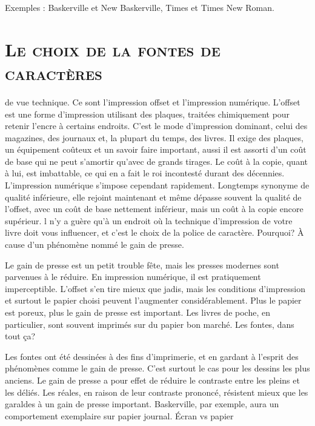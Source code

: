 \documentclass[12pt,a4paper,twocolumn]{book} %
\begin{document}
Exemples : Baskerville et New Baskerville, Times et Times New Roman.
\section{\textsc{Le choix de la fontes de caractères}}
de vue technique. Ce sont l’impression offset et l’impression numérique.
L’offset est une forme d’impression utilisant des plaques, traitées chimiquement pour retenir l’encre à certains endroits. C’est le mode d’impression dominant, celui des magazines, des journaux et, la plupart du temps, des livres. Il exige des plaques, un équipement coûteux et un savoir faire important, aussi il est assorti d’un coût de base qui ne peut s’amortir qu’avec de grands tirages. Le coût à la copie, quant à lui, est imbattable, ce qui en a fait le roi incontesté durant des décennies.
L’impression numérique s’impose cependant rapidement. Longtemps synonyme de qualité inférieure, elle rejoint maintenant et même dépasse souvent la qualité de l’offset, avec un coût de base nettement inférieur, mais un coût à la copie encore supérieur. 
l n’y a guère qu’à un endroit où la technique d’impression de votre livre doit vous influencer, et c’est le choix de la police de caractère. Pourquoi? À cause d’un phénomène nommé le gain de presse.

Le gain de presse est un petit trouble fête, mais les presses modernes sont parvenues à le réduire. En impression numérique, il est pratiquement imperceptible. L’offset s’en tire mieux que jadis, mais les conditions d’impression et surtout le papier choisi peuvent l’augmenter considérablement. Plus le papier est poreux, plus le gain de presse est important. Les livres de poche, en particulier, sont souvent imprimés sur du papier bon marché. Les fontes, dans tout ça?

Les fontes ont été dessinées à des fins d’imprimerie, et en gardant à l’esprit des phénomènes comme le gain de presse. C’est surtout le cas pour les dessins les plus anciens. Le gain de presse a pour effet de réduire le contraste entre les pleins et les déliés. Les réales, en raison de leur contraste prononcé, résistent mieux que les garaldes à un gain de presse important. Baskerville, par exemple, aura un comportement exemplaire sur papier journal.
Écran vs papier
\end{document}
